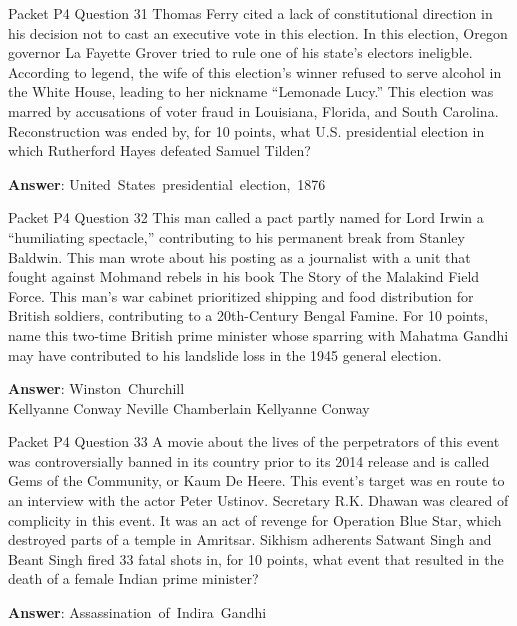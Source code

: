 \begin{frame}{Packet P4 Question 31}
Thomas Ferry cited a lack of constitutional direction in his decision not to cast an executive vote in this election. In this   election, Oregon governor La Fayette   Grover tried to rule one of his state's electors ineligble. According to legend, the wife of this election's winner refused to serve alcohol in the White House, leading to her nickname ``Lemonade Lucy.'' This election was marred by accusations of voter fraud in   Louisiana, Florida, and South Carolina. Reconstruction was   ended by, for 10 points, what U.S. presidential election in which Rutherford Hayes defeated Samuel Tilden?

\textbf{Answer}: United\ States\ presidential\ election,\ 1876\\
\end{frame}

\begin{frame}{Packet P4 Question 32}
This man called a pact   partly named for Lord Irwin a ``humiliating spectacle,'' contributing to his permanent break from Stanley Baldwin. This man wrote about his posting as a journalist with a unit that fought against Mohmand rebels in his book The Story of the Malakind Field Force. This man's war cabinet   prioritized shipping and food distribution   for British soldiers, contributing to a 20th-Century Bengal Famine. For 10 points, name this two-time British prime minister whose sparring with Mahatma Gandhi may have contributed to his landslide loss in the 1945 general election.    

\textbf{Answer}: Winston\ Churchill\\
 Kellyanne Conway
 Neville Chamberlain
 Kellyanne Conway
\end{frame}

\begin{frame}{Packet P4 Question 33}
A movie about the lives of the perpetrators of this event was controversially banned in its country prior to its 2014 release and is called Gems of the Community, or Kaum De Heere. This event's target was en route to an interview with the actor Peter Ustinov. Secretary R.K. Dhawan was cleared of complicity in this event. It was an act of revenge for Operation Blue Star, which destroyed parts of a temple in Amritsar. Sikhism     adherents Satwant Singh and Beant   Singh fired 33 fatal   shots in, for 10 points, what event that resulted in the death of a female Indian prime minister?

\textbf{Answer}: Assassination\ of\ Indira\ Gandhi\\
\end{frame}


